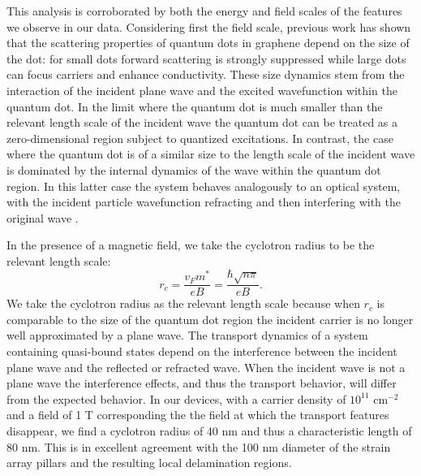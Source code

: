 \documentclass[edeposit,fullpage,draftthesis]{uiucthesis2009}
\begin{document}
            This analysis is corroborated by both the energy and field scales of the features we observe in our data. 
            Considering first the field scale,
            previous work \cite{heinisch2013mie} has shown that the scattering properties of
            quantum dots in graphene depend on the size of the dot:
            for small dots forward scattering is strongly suppressed while large dots can focus
            carriers and enhance conductivity. These size dynamics stem from the interaction of the incident
            plane wave and the excited wavefunction within the quantum dot. In the limit where the quantum dot
            is much smaller than the relevant length scale of the incident wave the quantum dot can be treated
            as a zero-dimensional region subject to quantized excitations. 
            In contrast, the case where the quantum dot is of a similar
            size to the length scale of the incident wave is dominated by the internal dynamics of the wave within
            the quantum dot region. In this latter case the system behaves analogously to an optical system,
            with the incident particle wavefunction refracting and then interfering with the original wave
            \cite{cserti2007caustics}.
            
            In the presence of a magnetic field, we take the cyclotron radius to be the relevant length scale:
            \begin{equation}
                r_c = \frac{v_F m^*}{e B} = \frac{\hbar \sqrt{n \pi}}{e B}.
            \end{equation}
            We take the cyclotron radius as the relevant length scale because 
            when $r_c$ is comparable to the size of the quantum dot region the incident carrier
            is no longer well approximated by a plane wave. The transport dynamics
            of a system containing quasi-bound states depend on the interference between the incident
            plane wave and the reflected or refracted wave. When the incident wave is not a plane wave the
            interference effects, and thus the transport behavior, will differ from the expected behavior.
            In our devices, with a carrier density of $10^{11}$ cm$^{-2}$ and a field of 1 T corresponding the the field 
            at which the transport features disappear,
            we find a cyclotron radius of 40 nm and thus a characteristic length of 80 nm.
            This is in excellent agreement with the 100 nm diameter of the strain array pillars
            and the resulting local delamination regions.
            
\end{document}

